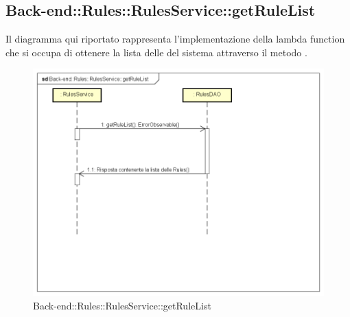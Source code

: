 \subsection{Back-end::Rules::RulesService::getRuleList}
Il diagramma qui riportato rappresenta l'implementazione della lambda function che si occupa di ottenere la lista delle  del sistema attraverso il metodo .
\begin{figure}[h] \centering \includegraphics[width=\textwidth,height=\textheight,keepaspectratio]{images/diagrams/back-end/Ufficial_Backend/Back-endRulesRulesServicegetRuleList.png} 	\caption{Back-end::Rules::RulesService::getRuleList}
\end{figure}
\newpage

